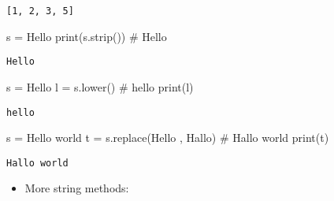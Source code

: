 \documentclass[
  letterpaper,
  DIV=11,
  numbers=noendperiod]{scrreprt}
\newenvironment{Shaded}{\begin{snugshade}}{\end{snugshade}}
\newcommand{\BuiltInTok}[1]{\textcolor[rgb]{0.00,0.46,0.62}{#1}}
\newcommand{\CommentTok}[1]{\textcolor[rgb]{0.37,0.37,0.37}{#1}}
\newcommand{\NormalTok}[1]{\textcolor[rgb]{0.00,0.46,0.62}{#1}}
\newcommand{\OperatorTok}[1]{\textcolor[rgb]{0.37,0.37,0.37}{#1}}
\newcommand{\StringTok}[1]{\textcolor[rgb]{0.13,0.47,0.30}{#1}}
\providecommand{\tightlist}{%
  \setlength{\itemsep}{0pt}\setlength{\parskip}{0pt}}
\begin{document}
\begin{verbatim}
[1, 2, 3, 5]
\end{verbatim}

\begin{Shaded}
\begin{Highlighting}[]
\NormalTok{s }\OperatorTok{=} \StringTok{\textquotesingle{}  Hello \textquotesingle{}}
\BuiltInTok{print}\NormalTok{(s.strip())     }\CommentTok{\# \textquotesingle{}Hello\textquotesingle{}}
\end{Highlighting}
\end{Shaded}

\begin{verbatim}
Hello
\end{verbatim}

\begin{Shaded}
\begin{Highlighting}[]
\NormalTok{s }\OperatorTok{=} \StringTok{\textquotesingle{}Hello\textquotesingle{}}
\NormalTok{l }\OperatorTok{=}\NormalTok{ s.lower()     }\CommentTok{\# \textquotesingle{}hello\textquotesingle{}}
\BuiltInTok{print}\NormalTok{(l)}
\end{Highlighting}
\end{Shaded}

\begin{verbatim}
hello
\end{verbatim}

\begin{Shaded}
\begin{Highlighting}[]
\NormalTok{s }\OperatorTok{=} \StringTok{\textquotesingle{}Hello world\textquotesingle{}}
\NormalTok{t }\OperatorTok{=}\NormalTok{ s.replace(}\StringTok{\textquotesingle{}Hello\textquotesingle{}}\NormalTok{ , }\StringTok{\textquotesingle{}Hallo\textquotesingle{}}\NormalTok{)   }\CommentTok{\# \textquotesingle{}Hallo world\textquotesingle{}}
\BuiltInTok{print}\NormalTok{(t)}
\end{Highlighting}
\end{Shaded}

\begin{verbatim}
Hallo world
\end{verbatim}

\begin{itemize}
\tightlist
\item
  More string methods:
\end{itemize}
\end{document}

